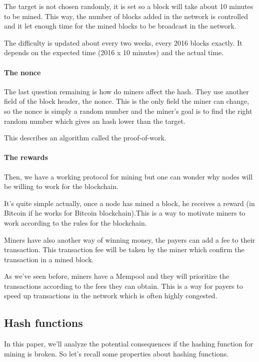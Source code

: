 The target is not chosen randomly, it is set so a block will take about 10 minutes to be mined. This way, the number of blocks added in the network is controlled and it let enough time for the mined blocks to be broadcast in the network.

The difficulty is updated about every two weeks, every 2016 blocks exactly. It depends on the expected time (2016 x 10 minutes) and the actual time.

  \paragraph{The nonce}

The last question remaining is how do miners affect the hash. They use another field of the block header, the nonce. This is the only field the miner can change, so the nonce is simply a random number and the miner's goal is to find the right random number which gives an hash lower than the target. \newline

This describes an algorithm called the proof-of-work.

  \paragraph{The rewards}

Then, we have a working protocol for mining but one can wonder why nodes will be willing to work for the blockchain.

It's quite simple actually, once a node has mined a block, he receives a reward (in Bitcoin if he works for Bitcoin blockchain).This is a way to motivate miners to work according to the rules for the blockchain. \newline

Miners have also another way of winning money, the payers can add a fee to their transaction. This transaction fee will be taken by the miner which confirm the transaction in a mined block.

As we've seen before, miners have a Mempool and they will prioritize the transactions according to the fees they can obtain. This is a way for payers to speed up transactions in the network which is often highly congested.


  \subsection{Hash functions}

In this paper, we'll analyze the potential consequences if the hashing function for mining is broken. So let's recall some properties about hashing functions. \newline

